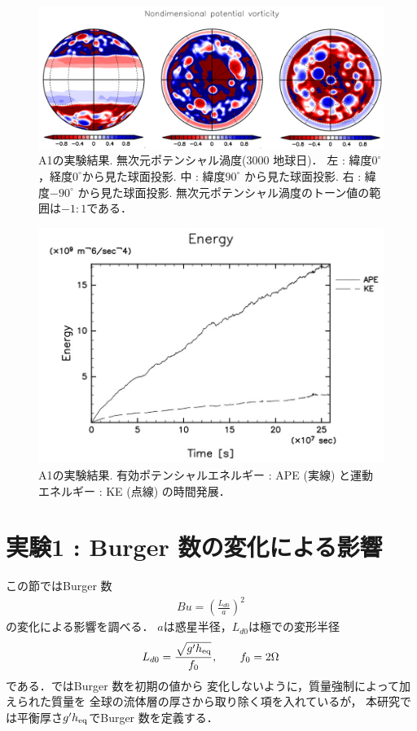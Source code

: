 \documentclass[a4j,12pt,openbib,oneside]{jreport}
\begin{document}
%
\begin{figure}[ht]
  \begin{center}
    \includegraphics[clip,width=12cm]{./fig/result/A1/A1_4.png}
    \caption{
      \footnotesize{A1の実験結果. 無次元ポテンシャル渦度(3000 地球日)．
左 : 緯度$0^\circ$，経度$0^\circ$から見た球面投影.
中 : 緯度$90^\circ$ から見た球面投影.
右 : 緯度$-90^\circ$ から見た球面投影.
無次元ポテンシャル渦度のトーン値の範囲は$-1:1$である．
      }
    }
    \label{fig:A1_4}
  \end{center}
\end{figure}
%
\begin{figure}[ht]
  \begin{center}
    \includegraphics[clip,width=12cm]{./fig/result/A1/A1_5.jpg}
    \caption{
      \footnotesize{A1の実験結果. 有効ポテンシャルエネルギー : APE (実線) と運動エネルギー : KE (点線) の時間発展．
      }
    }
    \label{fig:A1_5}
  \end{center}
\end{figure}
%
\clearpage
\newpage
\section{実験1 : Burger 数の変化による影響}
\label{sec:case1}
この節ではBurger 数 
\begin{align}
Bu = \left (\frac{L_{d0}}{a} \right )^2 \label{burger}
\end{align}
の変化による影響を調べる．
$a$は惑星半径，$L_{d0}$は極での変形半径
\begin{align}
L_{d0} = \frac{\sqrt{g'h_{{\rm{eq}}}}}{f_0}, \qquad f_0 = 2 \Omega
\end{align}
である．\cite{Brueshaber2019}ではBurger 数を初期の値から
変化しないように，質量強制によって加えられた質量を
全球の流体層の厚さから取り除く項を入れているが，
本研究では平衡厚さ$g'h_{{\rm{eq}}}$でBurger 数を定義する．
\end{document}
